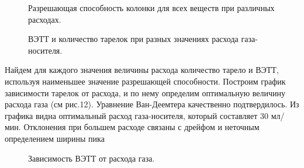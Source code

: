 \documentclass[12pt]{article}
\begin{document}
\begin{flushleft}
\begin{figure}[!h]
\caption{Разрешающая способность колонки для всех веществ при различных расходах.}
\label{ris:image}
\end{figure}
\begin{figure}[!h]
\caption{ВЭТТ и количество тарелок при разных значениях расхода газа-носителя.}
\label{ris:image}
\end{figure}
Найдем для каждого значения величины расхода количество тарело и ВЭТТ, используя
наименьшее значение разрешающей способности.
Построим график зависимости тарелок от расхода, и по нему определим оптимальную
величину расхода газа (см рис.12).
Уравнение Ван-Деемтера качественно подтвердилось. Из графика видна оптимальный
расход газа-носителя, который составляет 30 мл/мин. Отклонения при большем расходе
связаны с дрейфом и неточным определением ширины пика
\begin{figure}[!h]
\caption{Зависимость ВЭТТ от расхода газа.}
\label{ris:image}
\end{figure}



\end{flushleft}
\end{document}
